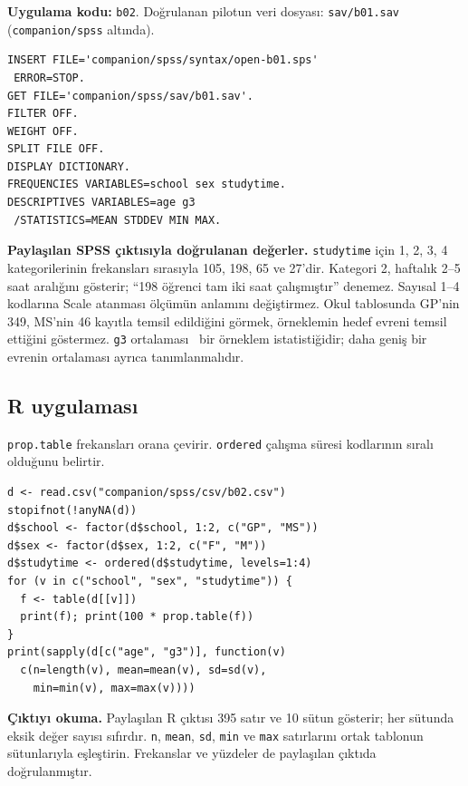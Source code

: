 \par\noindent\begin{minipage}{\linewidth}
\textbf{Uygulama kodu:} \texttt{b02}. Doğrulanan pilotun veri dosyası:
\texttt{sav/b01.sav} (\texttt{companion/spss} altında).

\begin{lstlisting}[style=prismSPSS]
INSERT FILE='companion/spss/syntax/open-b01.sps'
 ERROR=STOP.
GET FILE='companion/spss/sav/b01.sav'.
FILTER OFF.
WEIGHT OFF.
SPLIT FILE OFF.
DISPLAY DICTIONARY.
FREQUENCIES VARIABLES=school sex studytime.
DESCRIPTIVES VARIABLES=age g3
 /STATISTICS=MEAN STDDEV MIN MAX.
\end{lstlisting}

\end{minipage}\par

\begin{outputguidebox}
\textbf{Paylaşılan SPSS çıktısıyla doğrulanan değerler.}
\texttt{studytime} için 1, 2, 3, 4 kategorilerinin frekansları sırasıyla
105, 198, 65 ve 27'dir. Kategori 2, haftalık 2--5 saat aralığını gösterir;
``198 öğrenci tam iki saat çalışmıştır'' denemez. Sayısal 1--4 kodlarına
Scale atanması ölçümün anlamını değiştirmez. Okul tablosunda GP'nin 349,
MS'nin 46 kayıtla temsil edildiğini görmek, örneklemin hedef evreni temsil
ettiğini göstermez. \texttt{g3} ortalaması \SPContextMean\ bir örneklem
istatistiğidir; daha geniş bir evrenin ortalaması ayrıca tanımlanmalıdır.
\end{outputguidebox}


\par\noindent\begin{minipage}{\linewidth}
\subsection{R uygulaması}
\label{sec:r-gercek-b02}

\texttt{prop.table} frekansları orana çevirir. \texttt{ordered} çalışma süresi kodlarının sıralı olduğunu belirtir.

\begin{lstlisting}[style=prismR]
d <- read.csv("companion/spss/csv/b02.csv")
stopifnot(!anyNA(d))
d$school <- factor(d$school, 1:2, c("GP", "MS"))
d$sex <- factor(d$sex, 1:2, c("F", "M"))
d$studytime <- ordered(d$studytime, levels=1:4)
for (v in c("school", "sex", "studytime")) {
  f <- table(d[[v]])
  print(f); print(100 * prop.table(f))
}
print(sapply(d[c("age", "g3")], function(v)
  c(n=length(v), mean=mean(v), sd=sd(v),
    min=min(v), max=max(v))))
\end{lstlisting}

\textbf{Çıktıyı okuma.} Paylaşılan R çıktısı 395 satır ve 10 sütun
gösterir; her sütunda eksik değer sayısı sıfırdır. \texttt{n},
\texttt{mean}, \texttt{sd}, \texttt{min} ve \texttt{max} satırlarını
ortak tablonun sütunlarıyla eşleştirin. Frekanslar ve yüzdeler de
paylaşılan çıktıda doğrulanmıştır.
\end{minipage}\par

